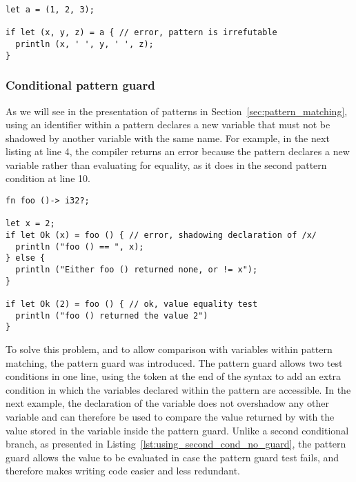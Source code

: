 \begin{lstlisting}[style=coloredverbatim]
let a = (1, 2, 3);

if let (x, y, z) = a { // error, pattern is irrefutable
  println (x, ' ', y, ' ', z);
}
\end{lstlisting}

\subsubsection{Conditional pattern guard}

As we will see in the presentation of patterns in
Section~\ref{sec:pattern_matching}, using an identifier within a pattern
declares a new variable that must not be shadowed by another variable with the
same name. For example, in the next listing at line 4, the compiler returns an
error because the pattern declares a new variable  rather than
evaluating for equality, as it does in the second pattern condition at line 10.

\begin{lstlisting}[style=coloredverbatim]
fn foo ()-> i32?;

let x = 2;
if let Ok (x) = foo () { // error, shadowing declaration of /x/
  println ("foo () == ", x);
} else {
  println ("Either foo () returned none, or != x");
}

if let Ok (2) = foo () { // ok, value equality test
  println ("foo () returned the value 2")
}
\end{lstlisting}

To solve this problem, and to allow comparison with variables within pattern
matching, the pattern guard was introduced. The pattern guard allows two test
conditions in one line, using the token \token{\&\&} at the end of the syntax
 to add an extra condition in which the
variables declared within the pattern are accessible. In the next example, the
declaration of the variable  does not overshadow any other variable and
can therefore be used to compare the value returned by  with the
value stored in the variable  inside the pattern guard. Unlike a second
conditional branch, as presented in
Listing~\ref{lst:using_second_cond_no_guard}, the pattern guard allows the
 value to be evaluated in case the pattern guard test fails, and
therefore makes writing code easier and less redundant.



